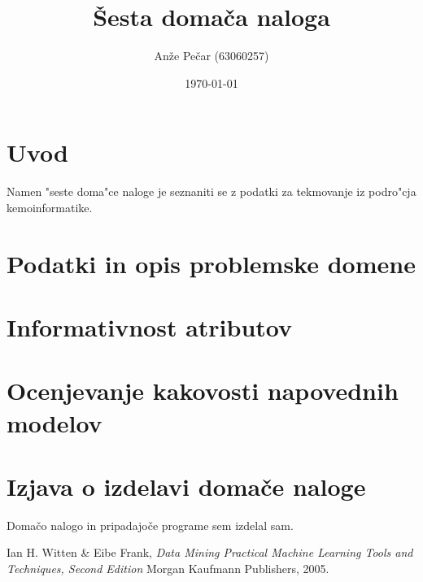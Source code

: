 \documentclass[a4paper,11pt]{article}
\title{Šesta domača naloga}
\author{Anže Pečar (63060257)}
\date{\today}
\begin{document}
\maketitle

\section{Uvod}
Namen "seste doma"ce naloge je seznaniti se z podatki za tekmovanje iz podro"cja kemoinformatike. 

\section{Podatki in opis problemske domene}

\section{Informativnost atributov}
\section{Ocenjevanje kakovosti napovednih modelov}



\section{Izjava o izdelavi domače naloge}
Domačo nalogo in pripadajoče programe sem izdelal sam.


\begin{thebibliography}{9}

   Ian H. Witten \& Eibe Frank,
   \emph{Data Mining Practical Machine Learning Tools and Techniques, Second Edition}
   Morgan Kaufmann Publishers,  
   2005.

\end{thebibliography}
\end{document}

